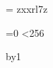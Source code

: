 \documentclass{article}
\begin{document}
\font\x= zxxrl7z%


=0
\loop
\ifnum{}<256
\the{}\ \bgroup\x\char{}\egroup\par
\advance{} by1\relax
\repeat
\end{document}
